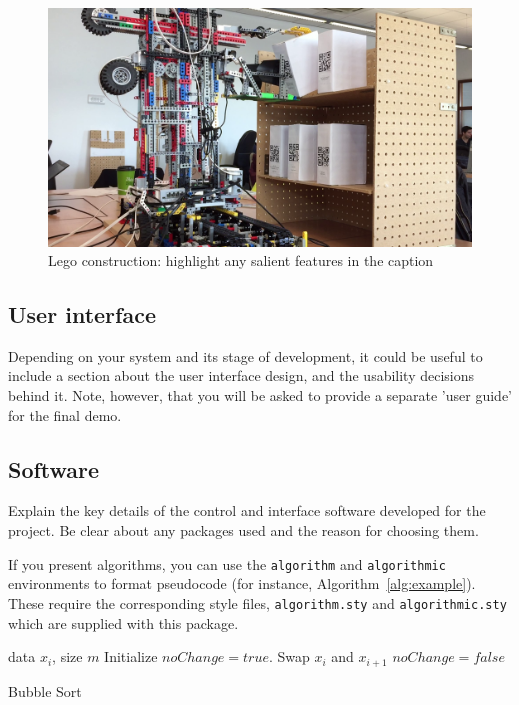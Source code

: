 \documentclass{article}
\begin{document}
\begin{figure}[tb]
\vskip 5mm
\begin{center}
\centerline{\includegraphics[width=\columnwidth]{figs/crane}}
\caption{Lego construction: highlight any salient features in the caption}
\label{fig:sample-fig}
\end{center}
\vskip -5mm
\end{figure} 

\subsection{User interface}

Depending on your system and its stage of development, it could be useful to include a section about the user interface design, and the usability decisions behind it. Note, however, that you will be asked to provide a separate 'user guide' for the final demo.

\subsection{Software}

Explain the key details of the control and interface software developed for the project. Be clear about any packages used and the reason for choosing them. 

If you present algorithms, you can use the \verb+algorithm+ and \verb+algorithmic+ environments to format pseudocode (for instance, Algorithm~\ref{alg:example}). These require the corresponding style files, \verb+algorithm.sty+ and \verb+algorithmic.sty+ which are supplied with this package. 

\begin{algorithm}[ht]
\begin{algorithmic}
    data $x_i$, size $m$
   \REPEAT
   \STATE Initialize $noChange = true$.
   \STATE Swap $x_i$ and $x_{i+1}$
   \STATE $noChange = false$
   \ENDIF
   \ENDFOR
\end{algorithmic}
  \caption{Bubble Sort}
  \label{alg:example}
\end{algorithm}
\end{document}
